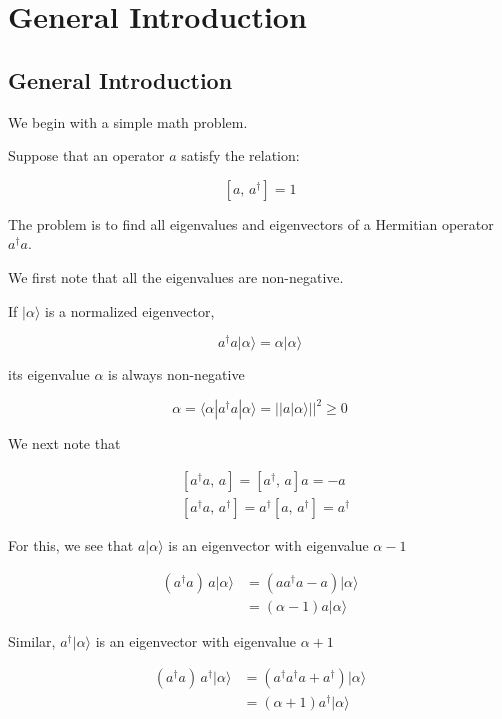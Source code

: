 \chapter{General Introduction}

\section{General Introduction}


We begin with a simple math problem.

Suppose that an operator $a$ satisfy the relation:

\[\left[a,\,a^{\dagger}\right] = 1 \]

The problem is to find all eigenvalues and eigenvectors of a Hermitian operator $a^{\dagger}a$.

We first note that all the eigenvalues are non-negative.

If $|\alpha\rangle$ is a normalized eigenvector,

\[a^{\dagger}a|\alpha\rangle = \alpha|\alpha\rangle \]

its eigenvalue $\alpha$ is always non-negative

\[\alpha = \langle\alpha| a^{\dagger}a|\alpha\rangle = ||a|\alpha\rangle||^2 \ge 0 \]

We next note that

\[\begin{split}
&\left[a^{\dagger}a,\,a\right] = \left[a^{\dagger},\, a\right]a = -a \\
&\left[a^{\dagger}a,\,a^{\dagger}\right] = a^{\dagger}\left[a,\,a^{\dagger}\right] = a^{\dagger}
\end{split} \]

For this, we see that $a|\alpha\rangle$ is an eigenvector with eigenvalue $\alpha - 1$

\[\begin{split}
(a^{\dagger}a)\,a|\alpha\rangle &= \left(aa^{\dagger}a -a\right)|\alpha\rangle \\
&=(\alpha - 1)a|\alpha\rangle
\end{split}\]

Similar, $a^{\dagger}|\alpha\rangle$ is an eigenvector with eigenvalue $\alpha + 1$

\[\begin{split}
(a^{\dagger}a)\,a^{\dagger}|\alpha\rangle &= \left(a^{\dagger}a^{\dagger}a +a^{\dagger}\right)|\alpha\rangle \\
&=(\alpha + 1)a^{\dagger}|\alpha\rangle
\end{split}\]

